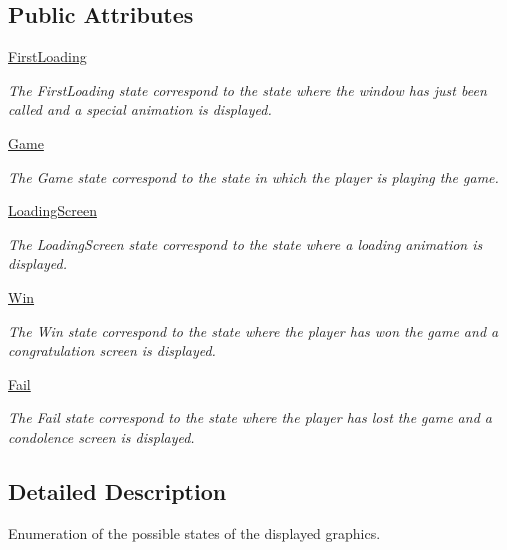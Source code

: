\subsection*{Public Attributes}
\begin{DoxyCompactItemize}
\item 
\hyperlink{a00038_a56269b4774b71a1dcba9e5e9cefb495e}{First\-Loading}
\begin{DoxyCompactList}\small\item\em The First\-Loading state correspond to the state where the window has just been called and a special animation is displayed. \end{DoxyCompactList}\item 
\hyperlink{a00038_abb4a2512f88d7104f91993174488282d}{Game}
\begin{DoxyCompactList}\small\item\em The Game state correspond to the state in which the player is playing the game. \end{DoxyCompactList}\item 
\hyperlink{a00038_a281f52964a4be64ea19bf2a401184521}{Loading\-Screen}
\begin{DoxyCompactList}\small\item\em The Loading\-Screen state correspond to the state where a loading animation is displayed. \end{DoxyCompactList}\item 
\hyperlink{a00038_adfd70a04c81f1ff3b289d5b766206fb5}{Win}
\begin{DoxyCompactList}\small\item\em The Win state correspond to the state where the player has won the game and a congratulation screen is displayed. \end{DoxyCompactList}\item 
\hyperlink{a00038_ace96026e75eb5118b66e8703fd93d68c}{Fail}
\begin{DoxyCompactList}\small\item\em The Fail state correspond to the state where the player has lost the game and a condolence screen is displayed. \end{DoxyCompactList}\end{DoxyCompactItemize}


\subsection{Detailed Description}
Enumeration of the possible states of the displayed graphics. 

